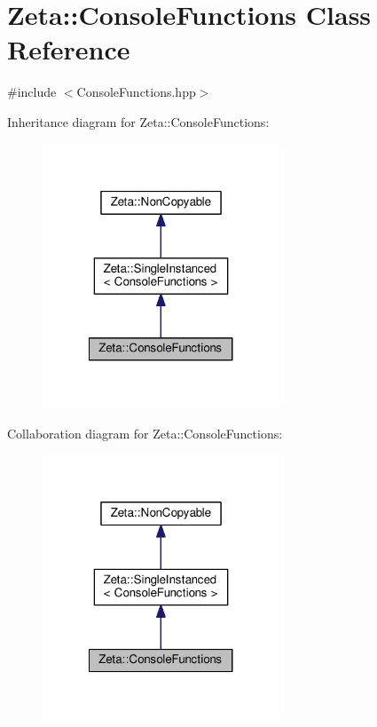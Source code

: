 \hypertarget{classZeta_1_1ConsoleFunctions}{\section{Zeta\+:\+:Console\+Functions Class Reference}
\label{classZeta_1_1ConsoleFunctions}
}


{\ttfamily \#include $<$Console\+Functions.\+hpp$>$}



Inheritance diagram for Zeta\+:\+:Console\+Functions\+:\nopagebreak
\begin{figure}[H]
\begin{center}
\leavevmode
\includegraphics[width=200pt]{classZeta_1_1ConsoleFunctions__inherit__graph}
\end{center}
\end{figure}


Collaboration diagram for Zeta\+:\+:Console\+Functions\+:\nopagebreak
\begin{figure}[H]
\begin{center}
\leavevmode
\includegraphics[width=200pt]{classZeta_1_1ConsoleFunctions__coll__graph}
\end{center}
\end{figure}

